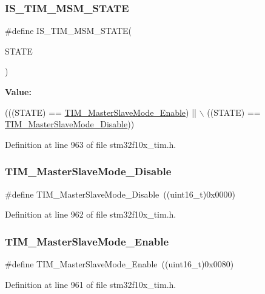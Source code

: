 \subsubsection{\texorpdfstring{I\+S\+\_\+\+T\+I\+M\+\_\+\+M\+S\+M\+\_\+\+S\+T\+A\+TE}{IS\_TIM\_MSM\_STATE}}
{\footnotesize\ttfamily \#define I\+S\+\_\+\+T\+I\+M\+\_\+\+M\+S\+M\+\_\+\+S\+T\+A\+TE(\begin{DoxyParamCaption}\item[{}]{S\+T\+A\+TE }\end{DoxyParamCaption})}

{\bfseries Value\+:}
\begin{DoxyCode}
(((STATE) == \hyperlink{group___t_i_m___master___slave___mode_gaef5da910ae6952fce424b440ea39f69a}{TIM\_MasterSlaveMode\_Enable}) || \(\backslash\)
                                 ((STATE) == \hyperlink{group___t_i_m___master___slave___mode_ga8d4c7c0f57469f384b1327bb323d28a3}{TIM\_MasterSlaveMode\_Disable}))
\end{DoxyCode}


Definition at line 963 of file stm32f10x\+\_\+tim.\+h.

\mbox{\label{group___t_i_m___master___slave___mode_ga8d4c7c0f57469f384b1327bb323d28a3}} 
\subsubsection{\texorpdfstring{T\+I\+M\+\_\+\+Master\+Slave\+Mode\+\_\+\+Disable}{TIM\_MasterSlaveMode\_Disable}}
{\footnotesize\ttfamily \#define T\+I\+M\+\_\+\+Master\+Slave\+Mode\+\_\+\+Disable~((uint16\+\_\+t)0x0000)}



Definition at line 962 of file stm32f10x\+\_\+tim.\+h.

\mbox{\label{group___t_i_m___master___slave___mode_gaef5da910ae6952fce424b440ea39f69a}} 
\subsubsection{\texorpdfstring{T\+I\+M\+\_\+\+Master\+Slave\+Mode\+\_\+\+Enable}{TIM\_MasterSlaveMode\_Enable}}
{\footnotesize\ttfamily \#define T\+I\+M\+\_\+\+Master\+Slave\+Mode\+\_\+\+Enable~((uint16\+\_\+t)0x0080)}



Definition at line 961 of file stm32f10x\+\_\+tim.\+h.

